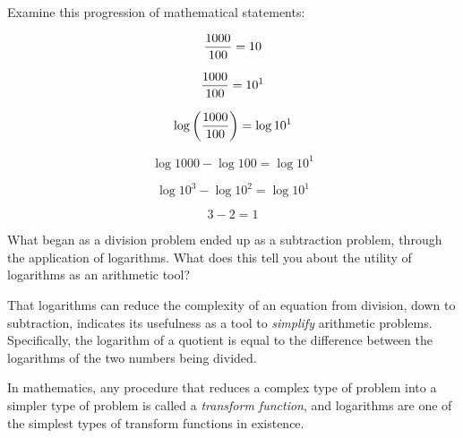 

Examine this progression of mathematical statements:

$${1000 \over 100} = 10$$

$${1000 \over 100} = 10^1$$

$$\log \left( {1000 \over 100} \right) = \log 10^1$$

$$\log 1000 - \log 100 = \log 10^1$$

$$\log 10^3 - \log 10^2 = \log 10^1$$

$$3 - 2 = 1$$

What began as a division problem ended up as a subtraction problem, through the application of logarithms.  What does this tell you about the utility of logarithms as an arithmetic tool?







That logarithms can reduce the complexity of an equation from division, down to subtraction, indicates its usefulness as a tool to {\it simplify} arithmetic problems.  Specifically, the logarithm of a quotient is equal to the difference between the logarithms of the two numbers being divided.







In mathematics, any procedure that reduces a complex type of problem into a simpler type of problem is called a {\it transform function}, and logarithms are one of the simplest types of transform functions in existence.




